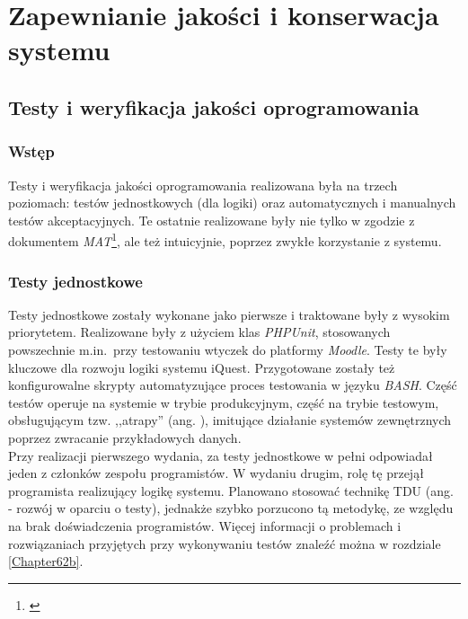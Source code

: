 \chapter{Zapewnianie jakości i konserwacja systemu}
\label{Chapter7}

\section{Testy i weryfikacja jakości oprogramowania}
\label{Chapter71}

\subsection{Wstęp}
\label{Chapter711}

Testy i weryfikacja jakości oprogramowania realizowana była na trzech poziomach: testów jednostkowych (dla logiki) oraz automatycznych i manualnych testów akceptacyjnych. Te ostatnie realizowane były nie tylko w zgodzie z dokumentem \textit{MAT}\footnote{\cite{Redmine:ProjDocs}}, ale też intuicyjnie, poprzez zwykłe korzystanie z systemu.

\subsection{Testy jednostkowe}
\label{Chapter712}

Testy jednostkowe zostały wykonane jako pierwsze i traktowane były z wysokim priorytetem. Realizowane były z użyciem klas \textit{PHPUnit}, stosowanych powszechnie m.in.~przy testowaniu wtyczek do platformy \textit{Moodle}. Testy te były kluczowe dla rozwoju logiki systemu iQuest. Przygotowane zostały też konfigurowalne skrypty automatyzujące proces testowania w języku \textit{BASH}. Część testów operuje na systemie w trybie produkcyjnym, część na trybie testowym, obsługującym tzw. ,,atrapy'' (ang. ), imitujące działanie systemów zewnętrznych poprzez zwracanie przykładowych danych.\\

Przy realizacji pierwszego wydania, za testy jednostkowe w pełni odpowiadał jeden z członków zespołu programistów. W wydaniu drugim, rolę tę przejął programista realizujący logikę systemu. Planowano stosować technikę TDU (ang.  - rozwój w oparciu o testy), jednakże szybko porzucono tą metodykę, ze względu na brak doświadczenia programistów. Więcej informacji o problemach i rozwiązaniach przyjętych przy wykonywaniu testów znaleźć można w rozdziale \ref{Chapter62b}. \\

